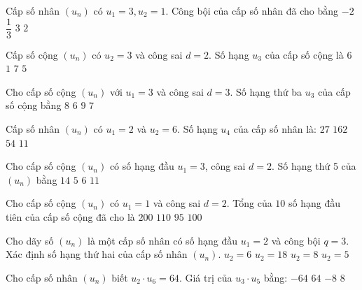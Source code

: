 \begin{ex}
Cấp số nhân $(u_n)$ có $u_1=3,u_2=1$. Công bội của cấp số nhân đã cho bằng
\choice
{$-2$}
{\True $\dfrac{1}{3}$}
{$3$}
{$2$ }
\end{ex}
\begin{ex}
Cấp số cộng $(u_n)$ có $u_2=3$ và công sai $d=2$. Số hạng $u_3$ của cấp số cộng là
\choice
{$6$}
{$1$}
{$7$}
{\True $5$}
\end{ex}
\begin{ex}
Cho cấp số cộng $(u_n)$ với $u_1=3$ và công sai $d=3$. Số hạng thứ ba $u_3$ của cấp số cộng bằng
\choice
{$8$}
{$6$}
{\True $9$}
{$7$}
\end{ex}
\begin{ex}
Cấp số nhân $(u_n)$ có $u_1=2$ và $u_2=6$. Số hạng $u_4$ của cấp số nhân là:
\choice
{\True $27$}
{$162$}
{$54$}
{$11$}
\end{ex}
\begin{ex}
Cho cấp số cộng $(u_n)$ có số hạng đầu $u_1=3$, công sai $d=2$. Số hạng thứ 5 của $(u_n)$ bằng
\choice
{$14$}
{$5$}
{$6$}
{\True $11$}
\end{ex}
\begin{ex}
Cho cấp số cộng $(u_n)$ có $u_1=1$ và công sai $d=2$. Tổng của $10$ số hạng đầu tiên của cấp số cộng đã cho là 
\choice
{$200$}
{$110$}
{$95$}
{\True $100$}
\end{ex}
\begin{ex}
Cho dãy số $(u_n)$ là một cấp số nhân có số hạng đầu $u_1=2$ và công bội $q=3$. Xác định số hạng thứ hai của cấp số nhân $(u_n)$.
\choice
{\True $u_2=6$}
{$u_2=18$}
{$u_2=8$}
{$u_2=5$}
\end{ex}
\begin{ex}
Cho cấp số nhân $(u_n)$ biết $u_2 \cdot u_6=64$. Giá trị của $u_3 \cdot u_5$ bằng:
\choice
{$-64$}
{\True $64$}
{$-8$}
{$8$}
\end{ex}
